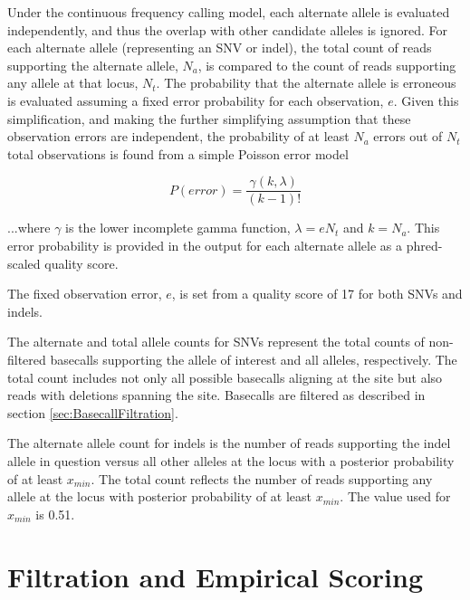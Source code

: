 \documentclass{article}
\begin{document}
Under the continuous frequency calling model, each alternate allele is evaluated independently, and thus the overlap with other candidate alleles is ignored. For each alternate allele (representing an SNV or indel), the total count of reads supporting the alternate allele, $N_a$, is compared to the count of reads supporting any allele at that locus, $N_t$. The probability that the alternate allele is erroneous is evaluated assuming a fixed error probability for each observation, $e$. Given this simplification, and making the further simplifying assumption that these observation errors are independent, the probability of at least $N_a$ errors out of $N_t$ total observations is found from a simple Poisson error model

\begin{equation*}
P(error) = \frac{\gamma(k,\lambda)}{(k-1)!}
\end{equation*}

...where $\gamma$ is the lower incomplete gamma function, $\lambda = e N_t$ and $k = N_a$. This error probability is provided in the output for each alternate allele as a phred-scaled quality score.

The fixed observation error, $e$, is set from a quality score of 17 for both SNVs and indels.

The alternate and total allele counts for SNVs represent the total counts of non-filtered basecalls supporting the allele of interest and all alleles, respectively. The total count includes not only all possible basecalls aligning at the site but also reads with deletions spanning the site. Basecalls are filtered as described in section \ref{sec:BasecallFiltration}.

The alternate allele count for indels is the number of reads supporting the indel allele in question versus all other alleles at the locus with a posterior probability of at least $x_{min}$. The total count reflects the number of reads supporting any allele at the locus with posterior probability of at least $x_{min}$. The value used for $x_{min}$ is 0.51.


\section{Filtration and Empirical Scoring}
\label{sec:FiltrationAndScoring}
\end{document}
